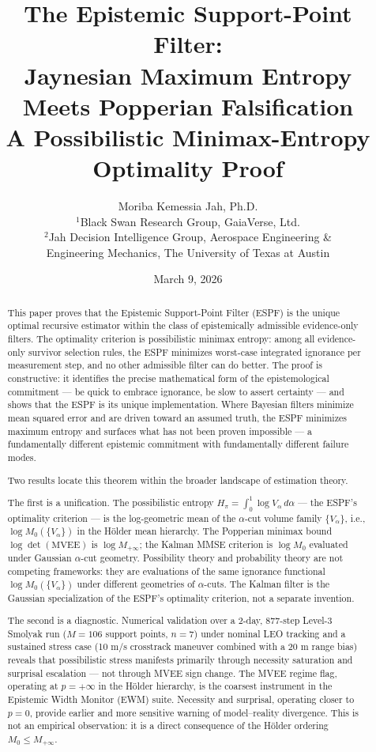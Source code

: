 \documentclass[12pt]{article}
\title{The Epistemic Support-Point Filter:\\
Jaynesian Maximum Entropy Meets Popperian Falsification\\
\large A Possibilistic Minimax-Entropy Optimality Proof}
\author{Moriba Kemessia Jah, Ph.D.\\
\small $^1$Black Swan Research Group, GaiaVerse, Ltd.\\
\small $^2$Jah Decision Intelligence Group, Aerospace Engineering \&\\
\small Engineering Mechanics, The University of Texas at Austin}
\date{March 9, 2026}
\begin{document}
\maketitle

\begin{abstract}
This paper proves that the Epistemic Support-Point Filter (ESPF) is the unique optimal
recursive estimator within the class of epistemically admissible evidence-only filters.
The optimality criterion is possibilistic minimax entropy: among all evidence-only survivor
selection rules, the ESPF minimizes worst-case integrated ignorance per measurement step,
and no other admissible filter can do better. The proof is constructive: it identifies the
precise mathematical form of the epistemological commitment --- be quick to embrace ignorance,
be slow to assert certainty --- and shows that the ESPF is its unique implementation.
Where Bayesian filters minimize mean squared error and are driven toward an assumed truth,
the ESPF minimizes maximum entropy and surfaces what has not been proven impossible ---
a fundamentally different epistemic commitment with fundamentally different failure modes.

Two results locate this theorem within the broader landscape of estimation theory.

The first is a unification. The possibilistic entropy $H_\pi = \int_0^1 \log V_\alpha\,d\alpha$
--- the ESPF's optimality criterion --- is the log-geometric mean of the $\alpha$-cut volume
family $\{V_\alpha\}$, i.e., $\log M_0(\{V_\alpha\})$ in the H\"{o}lder mean hierarchy. The
Popperian minimax bound $\log\det(\mathrm{MVEE})$ is $\log M_{+\infty}$; the Kalman MMSE
criterion is $\log M_0$ evaluated under Gaussian $\alpha$-cut geometry. Possibility theory
and probability theory are not competing frameworks: they are evaluations of the same
ignorance functional $\log M_0(\{V_\alpha\})$ under different geometries of $\alpha$-cuts.
The Kalman filter is the Gaussian specialization of the ESPF's optimality criterion, not
a separate invention.

The second is a diagnostic. Numerical validation over a 2-day, 877-step Level-3 Smolyak
run ($M = 106$ support points, $n = 7$) under nominal LEO tracking and a sustained stress
case (10 m/s crosstrack maneuver combined with a 20 m range bias) reveals that possibilistic
stress manifests primarily through necessity saturation and surprisal escalation --- not
through MVEE sign change. The MVEE regime flag, operating at $p = +\infty$ in the H\"{o}lder
hierarchy, is the coarsest instrument in the Epistemic Width Monitor (EWM) suite. Necessity
and surprisal, operating closer to $p = 0$, provide earlier and more sensitive warning of
model--reality divergence. This is not an empirical observation: it is a direct consequence
of the H\"{o}lder ordering $M_0 \leq M_{+\infty}$.


\end{abstract}
\end{document}
